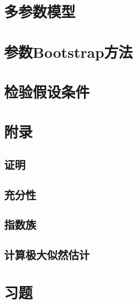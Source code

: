 \pending

\section{多参数模型}

\pending

\section{参数Bootstrap方法}

\pending

\section{检验假设条件}

\pending

\section{附录}

\subsection{证明}

\pending


\subsection{充分性}

\pending


\subsection{指数族}

\pending


\subsection{计算极大似然估计}

\pending

\section{习题}

\pending
